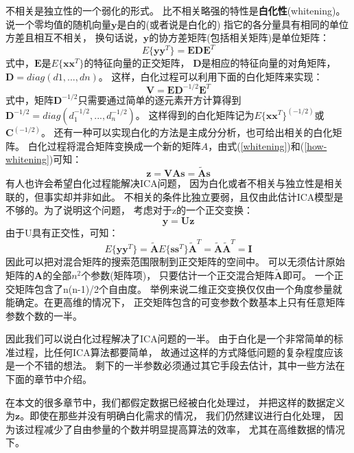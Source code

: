 不相关是独立性的一个弱化的形式。
比不相关略强的特性是\textbf{白化性}(whitening)。
说一个零均值的随机向量$\bm{y}$是白的(或者说是白化的)
指它的各分量具有相同的单位方差且相互不相关，
换句话说，$\bm{y}$的协方差矩阵(包括相关矩阵)是单位矩阵：
\begin{equation}
E\{\bm{yy}^T\}=\bm{EDE}^T
\label{whitening}
\end{equation}
式中，$\bm{E}$是$E\{\bm{xx}^T\}$的特征向量的正交矩阵，
$\bm{D}$是相应的特征向量的对角矩阵，$\bm{D}=diag(d1,...,dn)$。
这样，白化过程可以利用下面的白化矩阵来实现：
\begin{equation}
\bm{V}=\bm{ED}^{-1/2}\bm{E}^T
\label{how-whitening}
\end{equation}
式中，矩阵$\bm{D}^{-1/2}$只需要通过简单的逐元素开方计算得到
$\bm{D}^{-1/2}=diag(d_1^{-1/2},...,d_n^{-1/2})$。
这样得到的白化矩阵记为$E\{\bm{xx}^T\}^(-1/2)$或$\bm{C}^(-1/2)$。
还有一种可以实现白化的方法是主成分分析，也可给出相关的白化矩阵。
白化过程将混合矩阵变换成一个新的矩阵$A$，由式(\ref{whitening})和(\ref{how-whitening})可知：
\begin{equation}
\bm{z=VAs=\tilde{A}s}
\end{equation}
有人也许会希望白化过程能解决ICA问题，
因为白化或者不相关与独立性是相关联的，但事实却并非如此。
不相关的条件比独立要弱，且仅由此估计ICA模型是不够的。为了说明这个问题，
考虑对于z的一个正交变换：
\begin{equation}
\bm{y=Uz}
\end{equation}
由于U具有正交性，可知：
\begin{equation}
E\{\bm{yy}^T\}
=\tilde{\bm{A}}E\{\bm{ss}^T\}\tilde{\bm{A}}^T
=\tilde{\bm{A}}\tilde{\bm{A}}^T=\bm{I}
\end{equation}
因此可以把对混合矩阵的搜索范围限制到正交矩阵的空间中。
可以无须估计原始矩阵的$\bm{A}$的全部$n^2$个参数(矩阵项)，
只要估计一个正交混合矩阵$\tilde{\bm{A}}$即可。
一个正交矩阵包含了n(n-1)/2个自由度。
举例来说二维正交变换仅仅由一个角度参量就能确定。在更高维的情况下，
正交矩阵包含的可变参数个数基本上只有任意矩阵参数个数的一半。

因此我们可以说白化过程解决了ICA问题的一半。
由于白化是一个非常简单的标准过程，比任何ICA算法都要简单，
故通过这样的方式降低问题的复杂程度应该是一个不错的想法。
剩下的一半参数必须通过其它手段去估计，其中一些方法在下面的章节中介绍。

在本文的很多章节中，我们都假定数据已经被白化处理过，
并把这样的数据定义为$\bm{z}$。即使在那些并没有明确白化需求的情况，
我们仍然建议进行白化处理，
因为该过程减少了自由参量的个数并明显提高算法的效率，
尤其在高维数据的情况下。
   
